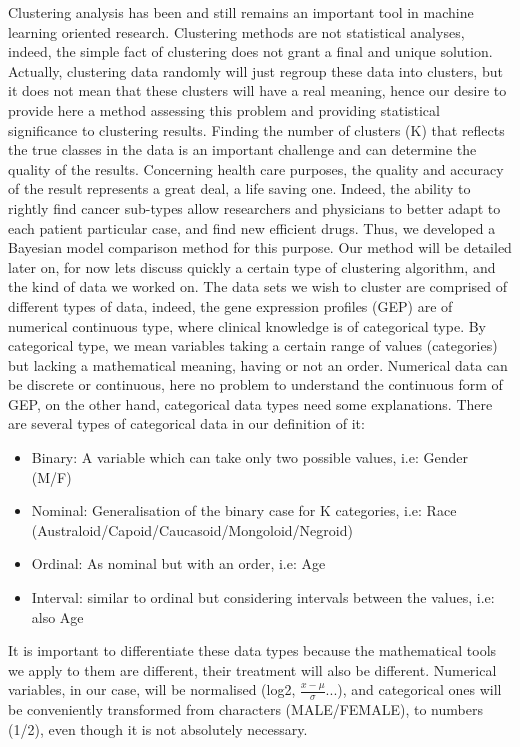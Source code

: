 \documentclass[twocolumn]{article}
\begin{document}
Clustering analysis has been and still remains an important tool in machine learning oriented research. Clustering methods are not statistical analyses, indeed, the simple fact of clustering
does not grant a final and unique solution. Actually, clustering data randomly will just regroup these data into clusters, but it does not mean that these clusters will have a real meaning, hence our desire to provide here a method assessing this problem and providing statistical significance to clustering results.
Finding the number of clusters (K) that reflects the true classes in the data is an important challenge and can determine the quality of the results. 
Concerning health care purposes, the quality and accuracy of the result represents a great deal, a life saving one.
Indeed, the ability to rightly find cancer sub-types allow researchers and physicians to better adapt to each patient particular case, and find new efficient drugs.
Thus, we developed a Bayesian model comparison method for this purpose.
Our method will be detailed later on, for now lets discuss quickly a certain type of clustering algorithm, and the kind of data we worked on.
The data sets we wish to cluster are comprised of different types of data, indeed, the gene expression profiles (GEP) are of numerical continuous type, where clinical knowledge is of categorical type. By categorical type, we mean variables taking a certain range of values (categories) but lacking a mathematical meaning, having or not an order.
Numerical data can be discrete or continuous, here no problem to understand the continuous form of GEP, on the other hand, categorical data types need some explanations.
There are several types of categorical data in our definition of it:
\begin{itemize}
    \item Binary: A variable which can take only two possible values, i.e: Gender (M/F)
    \item Nominal: Generalisation of the binary case for K categories, i.e: Race (Australoid/Capoid/Caucasoid/Mongoloid/Negroid)
    \item Ordinal: As nominal but with an order, i.e: Age
    \item Interval: similar to ordinal but considering intervals between the values, i.e: also Age
\end{itemize}
It is important to differentiate these data types because the mathematical tools we apply to them are different, their treatment will also be different.
Numerical variables, in our case, will be normalised (log2, $\frac{x-\mu}{\sigma}$...), and categorical ones will be conveniently transformed from characters (MALE/FEMALE), to numbers (1/2), even though it is not absolutely necessary.
\end{document}
